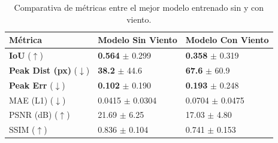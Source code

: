 \begin{table}[h]
    \centering
    \caption{Comparativa de métricas entre el mejor modelo entrenado sin y con viento.}
    \label{tab:summary_comparison}
    \begin{tabular}{lll}
        \hline
        Métrica & Modelo Sin Viento & Modelo Con Viento \\
        \hline
        \textbf{IoU} ($\uparrow$) & \textbf{0.564} $\pm$ 0.299 & \textbf{0.358} $\pm$ 0.319 \\
\textbf{Peak Dist (px)} ($\downarrow$) & \textbf{38.2} $\pm$ 44.6 & \textbf{67.6} $\pm$ 60.9 \\
\textbf{Peak Err} ($\downarrow$) & \textbf{0.102} $\pm$ 0.190 & \textbf{0.193} $\pm$ 0.248 \\
MAE (L1) ($\downarrow$) & 0.0415 $\pm$ 0.0304 & 0.0704 $\pm$ 0.0475 \\
PSNR (dB) ($\uparrow$) & 21.69 $\pm$ 6.25 & 17.03 $\pm$ 4.80 \\
SSIM ($\uparrow$) & 0.836 $\pm$ 0.104 & 0.741 $\pm$ 0.153 \\
        \hline
    \end{tabular}
\end{table}
